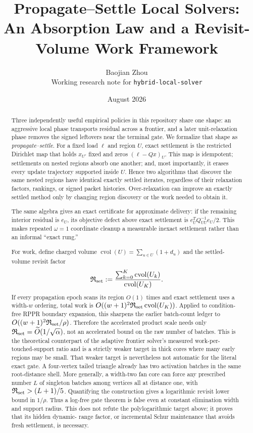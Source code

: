\documentclass[11pt]{article}
\title{Propagate--Settle Local Solvers:\\
An Absorption Law and a Revisit-Volume Work Framework}
\author{Baojian Zhou\\
\small Working research note for \texttt{hybrid-local-solver}}
\date{August 2026}
\begin{document}
\maketitle

\begin{abstract}
Three independently useful empirical policies in this repository share one
shape: an aggressive local phase transports residual across a frontier, and a
later unit-relaxation phase removes the signed leftovers near the terminal
gate.  We formalize that shape as \emph{propagate--settle}.  For a fixed load
$\ell$ and region $U$, exact settlement is the restricted Dirichlet map
that holds $x_{U^c}$ fixed and zeros $(\ell-Qx)_U$.  This map is idempotent;
settlements on nested regions absorb one another; and, most importantly, it
erases every update trajectory supported inside $U$.  Hence two algorithms
that discover the same nested regions have identical exactly settled
iterates, regardless of their relaxation factors, rankings, or signed packet
histories.  Over-relaxation can improve an exactly settled method only by
changing region discovery or the work needed to obtain it.

The same algebra gives an exact certificate for approximate delivery:
if the remaining interior residual is $e_U$, its objective defect above exact
settlement is $e_U^TQ_{UU}^{-1}e_U/2$.  This makes repeated $\omega=1$
coordinate cleanup a measurable inexact settlement rather than an informal
``exact rung.''

For work, define charged volume
$\operatorname{cvol}(U)=\sum_{u\in U}(1+d_u)$ and the settled-volume revisit
factor
\[
 \mathfrak R_{\rm set}
 :=\frac{\sum_{k=0}^K\operatorname{cvol}(U_k)}
          {\operatorname{cvol}(U_K)}.
\]
If every propagation epoch scans its region $O(1)$ times and exact settlement
uses a width-$w$ ordering, total work is
$O((w+1)^2\mathfrak R_{\rm set}\operatorname{cvol}(U_K))$.
Applied to condition-free RPPR boundary expansion, this sharpens the earlier
batch-count ledger to
$O((w+1)^2\mathfrak R_{\rm set}/\rho)$.  Therefore the accelerated product
scale needs only
$\mathfrak R_{\rm set}=\widetilde O(1/\sqrt\alpha)$, not an accelerated bound
on the raw number of batches.  This is the theoretical counterpart of the
adaptive frontier solver's measured work-per-touched-support ratio and is a
strictly weaker target in thick cores where many early regions may be small.
That weaker target is nevertheless not automatic for the literal exact gate.
A four-vertex tailed triangle already has two activation batches in the same
root-distance shell.  More generally, a width-two fan core can force any
prescribed number $L$ of singleton batches among vertices all at distance one,
with $\mathfrak R_{\rm set}>(L+1)/5$.  Quantifying the construction gives a
logarithmic revisit lower bound in $1/\rho$.  Thus a log-free gate theorem is
false even at constant elimination width and support radius.  This does not
refute the polylogarithmic target above; it proves that its hidden dynamic-
range factor, or incremental Schur maintenance that avoids fresh settlement,
is necessary.


\end{abstract}
\end{document}
